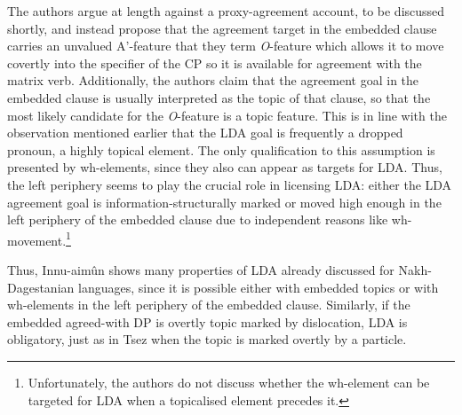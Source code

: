 \documentclass[output=paper
,modfonts
,nonflat]{langsci/langscibook}
\begin{document}
The authors argue at length against a proxy-agreement account, to be discussed shortly, and instead propose that the agreement target in the embedded clause carries an unvalued A'-feature that they term \textit{O}-feature which allows it to move covertly into the specifier of the CP so it is available for agreement with the matrix verb. Additionally, the authors claim that the agreement goal in the embedded clause is usually interpreted as the topic of that clause, so that the most likely candidate for the \textit{O}-feature is a topic feature. This is in line with the observation mentioned earlier that the LDA goal is frequently a dropped pronoun, a highly topical element. The only qualification to this assumption is presented by wh-elements, since they also can appear as targets for LDA. Thus, the left periphery seems to play the crucial role in licensing LDA: either the LDA agreement goal is information-structurally marked or moved high enough in the left periphery of the embedded clause due to independent reasons like wh-movement.\footnote{Unfortunately, the authors do not discuss whether the wh-element can be targeted for LDA when a topicalised element precedes it.}

Thus, Innu-aim\^{u}n shows many properties of LDA already discussed for Nakh-Dagestanian languages, since it is possible either with embedded topics or with wh-elements in the left periphery of the embedded clause. Similarly, if the embedded agreed-with DP is overtly topic marked by dislocation, LDA is obligatory, just as in Tsez when the topic is marked overtly by a particle.
\end{document}
